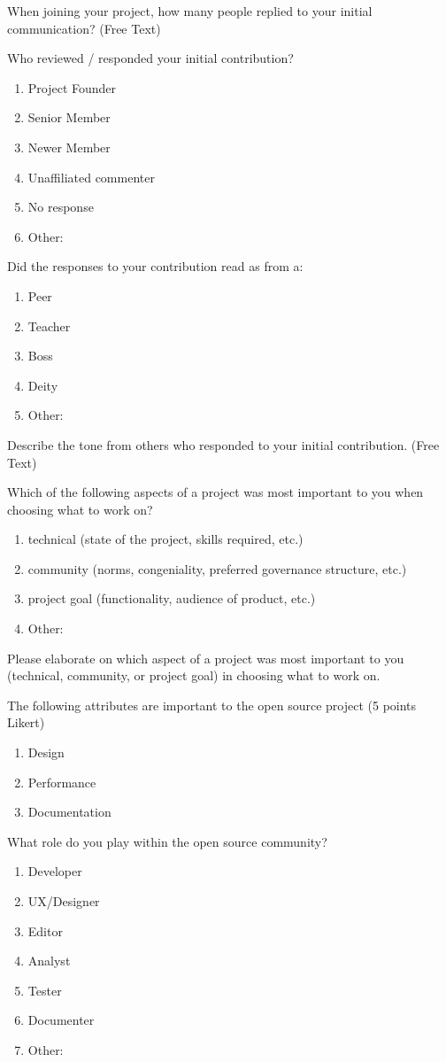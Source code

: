 \begin{table}
When joining your project, how many people replied to your initial communication? (Free Text)

Who reviewed / responded your initial contribution?
\begin{enumerate}
\item Project Founder
\item Senior Member
\item Newer Member
\item Unaffiliated commenter
\item No response
\item Other:
\end{enumerate}

Did the responses to your contribution read as from a:
\begin{enumerate}
\item Peer
\item Teacher
\item Boss
\item Deity 
\item Other:
\end{enumerate}

Describe the tone from others who responded to your initial contribution. (Free Text)

Which of the following aspects of a project was most important to you when choosing what to work on?
\begin{enumerate}
\item technical (state of the project, skills required, etc.)
\item community (norms, congeniality, preferred governance structure, etc.)
\item project goal (functionality, audience of product, etc.)
\item Other:
\end{enumerate}

Please elaborate on which aspect of a project was most important to you (technical, community, or project goal) in choosing what to work on. 

The following attributes are important to the open source project (5 points Likert)
\begin{enumerate}
\item Design
\item Performance
\item Documentation
\end{enumerate}

What role do you play within the open source community?
\begin{enumerate}
\item Developer
\item UX/Designer
\item Editor
\item Analyst
\item Tester
\item Documenter
\item Other:
\end{enumerate}


\end{table}
